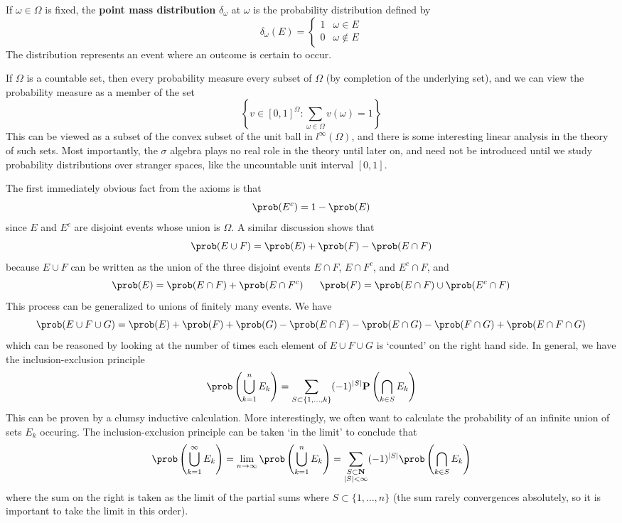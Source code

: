 \begin{example}
    If $\omega \in \Omega$ is fixed, the {\bf point mass distribution} $\delta_\omega$ at $\omega$ is the probability distribution defined by
    \[ \delta_\omega(E) = \begin{cases} 1 & \omega \in E \\ 0 & \omega \not \in E \end{cases} \]
    The distribution represents an event where an outcome is certain to occur.
\end{example}

\begin{example}
    If $\Omega$ is a countable set, then every probability measure every subset of $\Omega$ (by completion of the underlying set), and we can view the probability measure as a member of the set
    \[ \left\{ v \in [0,1]^\Omega: \sum_{\omega \in \Omega} v(\omega) = 1 \right\} \]
    This can be viewed as a subset of the convex subset of the unit ball in $l^\infty(\Omega)$, and there is some interesting linear analysis in the theory of such sets. Most importantly, the $\sigma$ algebra plays no real role in the theory until later on, and need not be introduced until we study probability distributions over stranger spaces, like the uncountable unit interval $[0,1]$.
\end{example}

The first immediately obvious fact from the axioms is that
%
\[ \prob(E^c) = 1 - \prob(E) \]
%
since $E$ and $E^c$ are disjoint events whose union is $\Omega$. A similar discussion shows that
%
\[ \prob(E \cup F) = \prob(E) + \prob(F) - \prob(E \cap F) \]
%
because $E \cup F$ can be written as the union of the three disjoint events $E \cap F$, $E \cap F^c$, and $E^c \cap F$, and
%
\[ \prob(E) = \prob(E \cap F) + \prob(E \cap F^c)\ \ \ \ \ \prob(F) = \prob(E \cap F) \cup \prob(E^c \cap F) \]
%
This process can be generalized to unions of finitely many events. We have
%
\[ \prob(E \cup F \cup G) = \prob(E) + \prob(F) + \prob(G) - \prob(E \cap F) - \prob(E \cap G) - \prob(F \cap G) + \prob(E \cap F \cap G) \]
%
which can be reasoned by looking at the number of times each element of $E \cup F \cup G$ is `counted' on the right hand side. In general, we have the inclusion-exclusion principle
%
\[ \prob \left( \bigcup_{k = 1}^n E_k \right) = \sum_{S \subset \{ 1, \dots, k \}} (-1)^{|S|} \mathbf{P} \left( \bigcap_{k \in S} E_k \right) \]
%
This can be proven by a clumsy inductive calculation. More interestingly, we often want to calculate the probability of an infinite union of sets $E_k$ occuring. The inclusion-exclusion principle can be taken `in the limit' to conclude that
%
\[ \prob \left(\bigcup_{k = 1}^\infty E_k \right) = \lim_{n \to \infty} \prob \left( \bigcup_{k = 1}^n E_k \right) = \sum_{\substack{S \subset \mathbf{N}\\|S| < \infty}} (-1)^{|S|} \prob \left( \bigcap_{k \in S} E_k \right) \]
%
where the sum on the right is taken as the limit of the partial sums where $S \subset \{ 1, \dots, n \}$ (the sum rarely convergences absolutely, so it is important to take the limit in this order).

